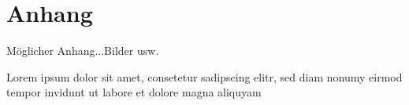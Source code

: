 \chapter{Anhang}
\label{scr:Anhang}
Möglicher Anhang...Bilder usw.

Lorem ipsum dolor sit amet, consetetur sadipscing elitr, sed diam nonumy eirmod tempor invidunt ut labore et dolore magna aliquyam